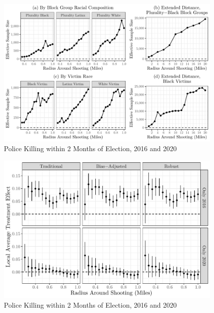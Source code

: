 \documentclass[
  12pt,
]{article}
\begin{document}
\begin{figure}[h]

{\centering \includegraphics{shoot_to_files/figure-latex/samples-bo-1} 

}

\caption{\label{fig:map}Police Killing within 2 Months of Election, 2016 and 2020}\label{fig:samples-bo}
\end{figure}

\begin{figure}[h]

{\centering \includegraphics{shoot_to_files/figure-latex/individ-years-1} 

}

\caption{\label{fig:map}Police Killing within 2 Months of Election, 2016 and 2020}\label{fig:individ-years}
\end{figure}
\end{document}
